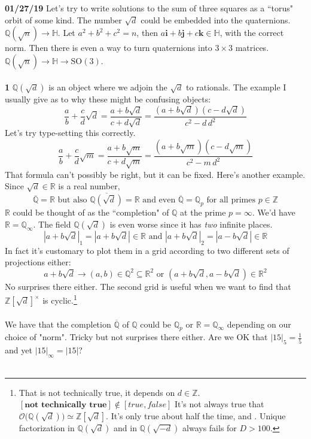 \documentclass[12pt]{article}
\begin{document}
\newpage

\noindent \textbf{01/27/19} Let's try to write solutions to the sum of three squares as a ``torus" orbit of some kind.  The number $\sqrt{d}$ could be embedded into the quaternions.  $ \mathbb{Q}(\sqrt{n}) \to \mathbb{H}$. Let $a^2 + b^2 + c^2 = n$, then $a \mathbf{i} + b \mathbf{j} + c \mathbf{k} \in \mathbb{H} $, with the correct norm.  Then there is even a way to turn quaternions into $3 \times 3$ matrices.  $\mathbb{Q}(\sqrt{n}) \to \mathbb{H} \to \text{SO}(3)$.   \\ \\
\textbf{1} $\mathbb{Q}(\sqrt{d})$ is an object where we adjoin the $\sqrt{d}$ to rationals.  The example I usually give as to why these might be confusing objects:
$$  \frac{a}{b} + \frac{c}{d} \sqrt{d} = \frac{a + b \sqrt{d}}{c + d \sqrt{d}} = \frac{(a+b\sqrt{d})(c - d \sqrt{d})}{c^2 - d \, d^2}$$
Let's try type-setting this correctly.
$$  \frac{a}{b} + \frac{c}{d} \sqrt{m} = \frac{a + b \sqrt{m}}{c + d \sqrt{m}} = \frac{(a+b\sqrt{m})(c - d \sqrt{m})}{c^2 - m \, d^2}$$
That formula can't possibly be right, but it can be fixed.  Here's another example.  Since $\sqrt{d} \in \mathbb{R}$ is a real number, 
$$ \overline{\mathbb{Q}} = \mathbb{R} \text{ but also } \overline{\mathbb{Q}(\sqrt{d})}= \mathbb{R} \text{ and even } \overline{\mathbb{Q}} = \mathbb{Q}_p \text{ for all primes }p \in \mathbb{Z} $$
$\mathbb{R}$ could be thought of as the ``completion" of $\mathbb{Q}$ at the prime $p = \infty$.  We'd have $\mathbb{R} = \mathbb{Q}_\infty$.  The field $\mathbb{Q}(\sqrt{d})$ is even worse since it has \textit{two} infinite places.
$$ |a+b\sqrt{d}|_1 = |a + b \sqrt{d}| \in \mathbb{R} \text{ and }|a+b\sqrt{d}|_2 = |a - b \sqrt{d}| \in \mathbb{R} $$
In fact it's customary to plot them in a grid according to two different sets of projections either:
$$ a + b\sqrt{d} \to (a,b) \in \mathbb{Q}^2 \subseteq \mathbb{R}^2 \text{ or }(a + b \sqrt{d}, a - b \sqrt{d}) \in \mathbb{R}^2 $$
No surprises there either. The second grid is useful when we want to find that $\mathbb{Z}[\sqrt{d}]^\times$ is cyclic.\footnote{That is not technically true, it depends on $d \in \mathbb{Z}$. $[\textbf{not technically true}] \notin [true, false]$ It's not always true that $\mathcal{O}\big( \mathbb{Q}(\sqrt{d})\big) \simeq \mathbb{Z}[\sqrt{d}]$.  It's only true about half the time, and .  Unique factorization in $\mathbb{Q}(\sqrt{d})$ and in $\mathbb{Q}(\sqrt{-d})$ always fails for $D > 100$. } \\ \\
We have that the completion $\overline{\mathbb{Q}}$ of $\mathbb{Q}$ could be $\mathbb{Q}_p$ or $\mathbb{R} = \mathbb{Q}_\infty$  depending on our choice of "norm".  Tricky but not surprises there either. Are we OK that $|15|_5 = \frac{1}{5}$ and yet $|15|_\infty = |15|$? \\ \\
\end{document}
